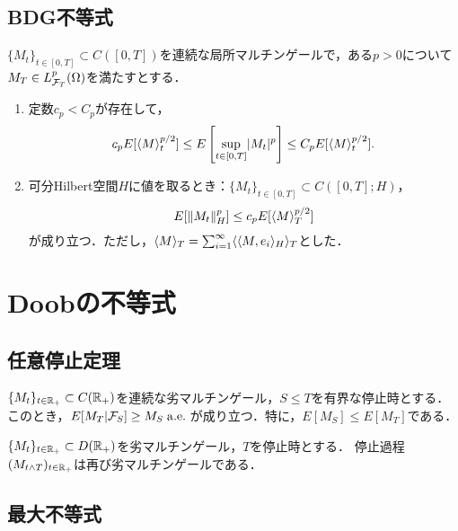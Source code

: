 \documentclass[uplatex,dvipdfmx]{jsreport}
\begin{document}
\subsection{BDG不等式}

\begin{theorem}
    $\{M_t\}_{t\in[0,T]}\subset C([0,T])$を連続な局所マルチンゲールで，ある$p>0$について$M_T\in L^p_{\mathcal{F}_T}(\Omega)$を満たすとする．
    \begin{enumerate}
        \item 定数$c_p<C_p$が存在して，
        \[c_pE[\langle M\rangle_t^{p/2}]\le E\left[\sup_{t\in[0,T]}\lvert M_t\rvert^p\right]\le C_pE[\langle M\rangle_t^{p/2}].\]
        \item 可分Hilbert空間$H$に値を取るとき：$\{M_t\}_{t\in[0,T]}\subset C([0,T];H)$，
        \[E[\|M_t\|^p_H]\le c_pE[\langle M\rangle_T^{p/2}]\]
        が成り立つ．ただし，$\langle M\rangle_T=\sum^\infty_{i=1}\langle\langle M,e_i\rangle_H\rangle_T$とした．
    \end{enumerate}
\end{theorem}

\section{Doobの不等式}

\subsection{任意停止定理}

\begin{theorem}\label{thm-Doob-optional-stopping}
    $\{M_t\}_{t\in\mathbb{R}_+}\subset C(\mathbb{R}_+)$を連続な劣マルチンゲール，$S\le T$を有界な停止時とする．
    このとき，$E[M_T|\mathcal{F}_S]\ge M_S\;\mathrm{a.e.}\;$が成り立つ．特に，$E[M_S]\le E[M_T]$である．
\end{theorem}

\begin{corollary}[有界とは限らない停止時に関する停止過程へのマルチンゲール性の遺伝]
    $\{M_t\}_{t\in\mathbb{R}_+}\subset D(\mathbb{R}_+)$を劣マルチンゲール，$T$を停止時とする．
    停止過程$(M_{t\land T})_{t\in\mathbb{R}_+}$は再び劣マルチンゲールである．
\end{corollary}

\subsection{最大不等式}
\end{document}
